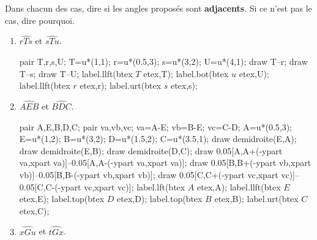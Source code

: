 \begin{exercice*}
    Dans chacun des cas, dire si les angles proposés sont \textbf{adjacents}. Si ce n'est pas le cas, dire pourquoi.
    \begin{multicols}{2}
        \begin{enumerate}
            \item $\widehat{rTs}$ et $\widehat{sTu}$.\par
            \hspace*{-5mm}
            \begin{Geometrie}[CoinHD={(4.5u,4u)}]
                pair T,r,s,U;
                T=u*(1,1);
                r=u*(0.5,3);
                s=u*(3,2);
                U=u*(4,1);
                draw T--r;
                draw T--s;
                draw T--U;
                label.llft(btex $T$ etex,T);
                label.bot(btex $u$ etex,U);
                label.llft(btex $r$ etex,r);
                label.urt(btex $s$ etex,s);
            \end{Geometrie}
            \item $\widehat{AEB}$ et $\widehat{BDC}$.\par
            \hspace*{-5mm}
            \begin{Geometrie}[CoinHD={(4u,4u)}]
                pair A,E,B,D,C;
                pair va,vb,vc;
                va=A-E;
                vb=B-E;
                vc=C-D;
                A=u*(0.5,3);
                E=u*(1,2);
                B=u*(3,2);
                D=u*(1.5,2);
                C=u*(3.5,1);            
                draw demidroite(E,A);
                draw demidroite(E,B);
                draw demidroite(D,C);
                draw 0.05[A,A+(-ypart va,xpart va)]--0.05[A,A-(-ypart va,xpart va)];
                draw 0.05[B,B+(-ypart vb,xpart vb)]--0.05[B,B-(-ypart vb,xpart vb)];
                draw 0.05[C,C+(-ypart vc,xpart vc)]--0.05[C,C-(-ypart vc,xpart vc)];
                label.lft(btex $A$ etex,A);
                label.llft(btex $E$ etex,E);
                label.top(btex $D$ etex,D);
                label.top(btex $B$ etex,B);
                label.urt(btex $C$ etex,C);
            \end{Geometrie}
            \item $\widehat{xGu}$ et $\widehat{tGx}$.\par
            \hspace*{-5mm}
            \begin{Geometrie}[CoinHD={(4u,3.5u)}]

\end{Geometrie}
\end{enumerate}
\end{multicols}
\end{exercice*}
